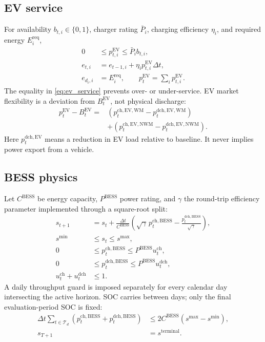 \documentclass[final,5p,times]{elsarticle}
\newcommand{\dt}{\Delta t}
\newcommand{\EV}{\mathrm{EV}}
\newcommand{\BESS}{\mathrm{BESS}}
\newcommand{\WM}{\mathrm{WM}}
\newcommand{\NWM}{\mathrm{NWM}}
\newcommand{\ch}{\mathrm{ch}}
\newcommand{\dch}{\mathrm{dch}}
\newcommand{\req}{\mathrm{req}}
\newcommand{\calT}{\mathcal{T}}
\begin{document}
\subsection{EV service}
For availability $b_{t,i}\in\{0,1\}$, charger rating $\bar P_i$, charging
efficiency $\eta_i$, and required energy $E_i^{\req}$,
\begin{align}
0&\le p_{t,i}^{\EV}\le \bar P_i b_{t,i}, \label{eq:ev_power}\\
e_{t,i}&=e_{t-1,i}+\eta_i p_{t,i}^{\EV}\dt, \label{eq:ev_state}\\
e_{d_i,i}&=E_i^{\req},\qquad
p_t^{\EV}=\sum_i p_{t,i}^{\EV}. \label{eq:ev_service}
\end{align}
The equality in \eqref{eq:ev_service} prevents over- or under-service.
EV market flexibility is a deviation from $B_t^{\EV}$, not physical discharge:
\begin{align}
p_t^{\EV}-B_t^{\EV}
={}&(p_t^{\ch,\EV,\WM}-p_t^{\dch,\EV,\WM}) \nonumber\\
&+(p_t^{\ch,\EV,\NWM}-p_t^{\dch,\EV,\NWM}). \label{eq:ev_split}
\end{align}
Here $p_t^{\dch,\EV}$ means a reduction in EV load relative to baseline. It
never implies power export from a vehicle.

\subsection{BESS physics}
Let $C^{\BESS}$ be energy capacity, $P^{\BESS}$ power rating, and $\gamma$ the
round-trip efficiency parameter implemented through a square-root split:
\begin{align}
s_{t+1}
&=s_t+\frac{\dt}{C^{\BESS}}
\left(\sqrt{\gamma}\,p_t^{\ch,\BESS}
-\frac{p_t^{\dch,\BESS}}{\sqrt{\gamma}}\right), \label{eq:soc}\\
s^{\min}&\le s_t\le s^{\max}, \label{eq:soc_bounds}\\
0&\le p_t^{\ch,\BESS}\le P^{\BESS}u_t^{\ch}, \label{eq:bess_charge_power}\\
0&\le p_t^{\dch,\BESS}\le P^{\BESS}u_t^{\dch}, \label{eq:bess_discharge_power}\\
u_t^{\ch}+u_t^{\dch}&\le1. \label{eq:bess_direction}
\end{align}
A daily throughput guard is imposed separately for every calendar day
intersecting the active horizon. SOC carries between days; only the final
evaluation-period SOC is fixed:
\begin{align}
\dt\sum_{t\in\calT_d}
(p_t^{\ch,\BESS}+p_t^{\dch,\BESS})
&\le 2C^{\BESS}(s^{\max}-s^{\min}), \label{eq:throughput}\\
s_{T+1}&=s^{\mathrm{terminal}}. \label{eq:terminal}
\end{align}
\end{document}
